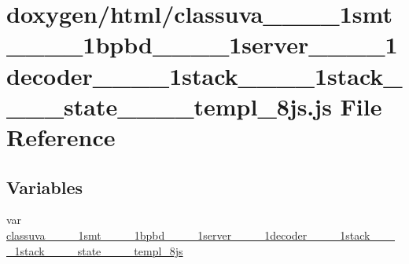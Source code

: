 \hypertarget{classuva____1____1smt____1____1bpbd____1____1server____1____1decoder____1____1stack____1____1sta0ad30d56f43cacd3e7a117a525f20016}{}\section{doxygen/html/classuva\+\_\+\+\_\+\_\+\+\_\+1smt\+\_\+\+\_\+\_\+\+\_\+1bpbd\+\_\+\+\_\+\_\+\+\_\+1server\+\_\+\+\_\+\_\+\+\_\+1decoder\+\_\+\+\_\+\_\+\+\_\+1stack\+\_\+\+\_\+\_\+\+\_\+1stack\+\_\+\+\_\+\+\_\+\+\_\+state\+\_\+\+\_\+\+\_\+\+\_\+templ\+\_\+8js.js File Reference}
\label{classuva____1____1smt____1____1bpbd____1____1server____1____1decoder____1____1stack____1____1sta0ad30d56f43cacd3e7a117a525f20016}
\subsection*{Variables}
\begin{DoxyCompactItemize}
\item 
var \hyperlink{classuva____1____1smt____1____1bpbd____1____1server____1____1decoder____1____1stack____1____1sta0ad30d56f43cacd3e7a117a525f20016_abe5ef60c6c173f35337c2ee13db2c5e5}{classuva\+\_\+\+\_\+\_\+\+\_\+1smt\+\_\+\+\_\+\_\+\+\_\+1bpbd\+\_\+\+\_\+\_\+\+\_\+1server\+\_\+\+\_\+\_\+\+\_\+1decoder\+\_\+\+\_\+\_\+\+\_\+1stack\+\_\+\+\_\+\_\+\+\_\+1stack\+\_\+\+\_\+\+\_\+\+\_\+state\+\_\+\+\_\+\+\_\+\+\_\+templ\+\_\+8js}
\end{DoxyCompactItemize}


